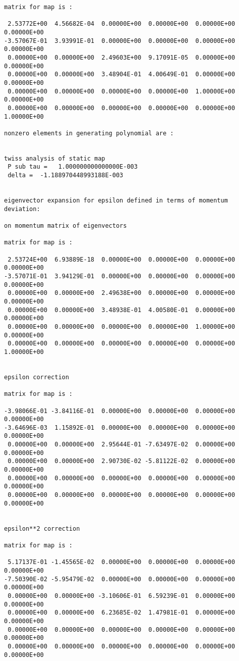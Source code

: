 \begin{footnotesize}
\begin{verbatim}
matrix for map is :

 2.53772E+00  4.56682E-04  0.00000E+00  0.00000E+00  0.00000E+00  0.00000E+00
-3.57067E-01  3.93991E-01  0.00000E+00  0.00000E+00  0.00000E+00  0.00000E+00
 0.00000E+00  0.00000E+00  2.49603E+00  9.17091E-05  0.00000E+00  0.00000E+00
 0.00000E+00  0.00000E+00  3.48904E-01  4.00649E-01  0.00000E+00  0.00000E+00
 0.00000E+00  0.00000E+00  0.00000E+00  0.00000E+00  1.00000E+00  0.00000E+00
 0.00000E+00  0.00000E+00  0.00000E+00  0.00000E+00  0.00000E+00  1.00000E+00

nonzero elements in generating polynomial are :


twiss analysis of static map
 P sub tau =   1.000000000000000E-003
 delta =  -1.188970448993188E-003


eigenvector expansion for epsilon defined in terms of momentum deviation:

on momentum matrix of eigenvectors

matrix for map is :

 2.53724E+00  6.93889E-18  0.00000E+00  0.00000E+00  0.00000E+00  0.00000E+00
-3.57071E-01  3.94129E-01  0.00000E+00  0.00000E+00  0.00000E+00  0.00000E+00
 0.00000E+00  0.00000E+00  2.49638E+00  0.00000E+00  0.00000E+00  0.00000E+00
 0.00000E+00  0.00000E+00  3.48938E-01  4.00580E-01  0.00000E+00  0.00000E+00
 0.00000E+00  0.00000E+00  0.00000E+00  0.00000E+00  1.00000E+00  0.00000E+00
 0.00000E+00  0.00000E+00  0.00000E+00  0.00000E+00  0.00000E+00  1.00000E+00


epsilon correction

matrix for map is :

-3.98066E-01 -3.84116E-01  0.00000E+00  0.00000E+00  0.00000E+00  0.00000E+00
-3.64696E-03  1.15892E-01  0.00000E+00  0.00000E+00  0.00000E+00  0.00000E+00
 0.00000E+00  0.00000E+00  2.95644E-01 -7.63497E-02  0.00000E+00  0.00000E+00
 0.00000E+00  0.00000E+00  2.90730E-02 -5.81122E-02  0.00000E+00  0.00000E+00
 0.00000E+00  0.00000E+00  0.00000E+00  0.00000E+00  0.00000E+00  0.00000E+00
 0.00000E+00  0.00000E+00  0.00000E+00  0.00000E+00  0.00000E+00  0.00000E+00


epsilon**2 correction

matrix for map is :

 5.17137E-01 -1.45565E-02  0.00000E+00  0.00000E+00  0.00000E+00  0.00000E+00
-7.50390E-02 -5.95479E-02  0.00000E+00  0.00000E+00  0.00000E+00  0.00000E+00
 0.00000E+00  0.00000E+00 -3.10606E-01  6.59239E-01  0.00000E+00  0.00000E+00
 0.00000E+00  0.00000E+00  6.23685E-02  1.47981E-01  0.00000E+00  0.00000E+00
 0.00000E+00  0.00000E+00  0.00000E+00  0.00000E+00  0.00000E+00  0.00000E+00
 0.00000E+00  0.00000E+00  0.00000E+00  0.00000E+00  0.00000E+00  0.00000E+00



\end{verbatim}
\end{footnotesize}
